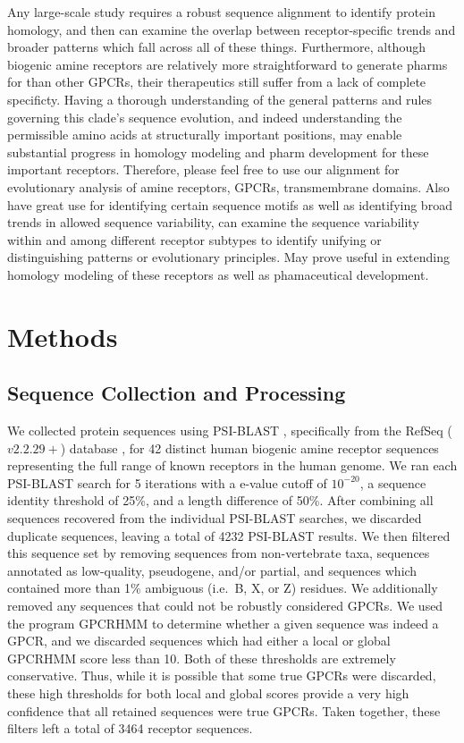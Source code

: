 \documentclass[fleqn,10pt]{wlpeerj}
\begin{document}
Any large-scale study requires a robust sequence alignment to identify protein homology, and then can examine the overlap between receptor-specific trends and broader patterns which fall across all of these things. Furthermore, although biogenic amine receptors are relatively more straightforward to generate pharms for than other GPCRs, their therapeutics still suffer from a lack of complete specificty. Having a thorough understanding of the general patterns and rules governing this clade's sequence evolution, and indeed understanding the permissible amino acids at structurally important positions, may enable substantial progress in homology modeling and pharm development for these important receptors.
Therefore, please feel free to use our alignment for evolutionary analysis of amine receptors, GPCRs, transmembrane domains. Also have great use for identifying certain sequence motifs as well as identifying broad trends in allowed sequence variability, can examine the sequence variability within and among different receptor subtypes to identify unifying or distinguishing patterns or evolutionary principles. May prove useful in extending homology modeling of these receptors as well as phamaceutical development. 



\section*{Methods}

\subsection*{Sequence Collection and Processing}
We collected protein sequences using PSI-BLAST \citep{psiblast}, specifically from the RefSeq ($v2.2.29+$) database \citep{refseq}, for 42 distinct human biogenic amine receptor sequences representing the full range of known receptors in the human genome. We ran each PSI-BLAST search for 5 iterations with a e-value cutoff of $10^{-20}$, a sequence identity threshold of 25\%, and a length difference of 50\%. After combining all sequences recovered from the individual PSI-BLAST searches, we discarded duplicate sequences, leaving a total of 4232 PSI-BLAST results. We then filtered this sequence set by removing sequences from non-vertebrate taxa, sequences annotated as low-quality, pseudogene, and/or partial, and sequences which contained more than 1\% ambiguous (i.e.\ B, X, or Z) residues. We additionally removed any sequences that could not be robustly considered GPCRs. We used the program GPCRHMM \citep{Wistrand2006} to determine whether a given sequence was indeed a GPCR, and we discarded sequences which had either a local or global GPCRHMM score less than 10. Both of these thresholds are extremely conservative. Thus, while it is possible that some true GPCRs were discarded, these high thresholds for both local and global scores provide a very high confidence that all retained sequences were true GPCRs. Taken together, these filters left a total of 3464 receptor sequences.
\end{document}
